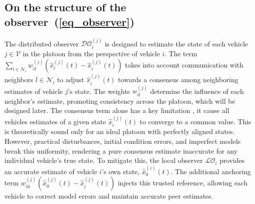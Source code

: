 \documentclass{ifacconf}
\def\eqref#1{(\ref{#1})}
\def\LO{\mathcal{LO}} %
\def\DO{\mathcal{DO}} %
\newtheorem{remark}{\it \textbf{Remark}}%
\begin{document}
\subsection{On the structure of the observer~\eqref{eq_observer}}
\vspace*{-0.3cm}
%
The distributed observer $\DO_i^{(j)}$ is designed to estimate the state of each vehicle $j \in \mathcal{V}$ in the platoon from the perspective of vehicle $i$. 
The term $\sum_{l \in {\mathcal{N}}_i} w_{il}^{(j)} \left( \hat{x}_l^{(j)}(t) - \hat{x}_i^{(j)}(t) \right)$ takes into account communication with neighbors $l \in {\mathcal{N}}_i$ to adjust $\hat{x}_i^{(j)}(t)$ towards a consensus among neighboring estimates of vehicle $j$'s state. The weights $w_{il}^{(j)}$ determine the influence of each neighbor's estimate, promoting consistency across the platoon, which will be designed later. The consensus term alone has a key limitation , it cause all vehicles estimates of a given state $\hat{x}_i^{(j)}(t)$ to converge to a common value. This is theoretically sound only for an ideal platoon with perfectly aligned states. However, practical disturbances, initial condition errors, and imperfect models break this uniformity, rendering a pure consensus estimate inaccurate for any individual vehicle's true state. To mitigate this, the local observer $\LO_i$ provides an accurate estimate of vehicle $i$'s own state, $\hat{x}_0^{(i)}(t)$. The additional anchoring term $w_{i0}^{(j)} \left( \hat{x}_0^{(j)}(t) - \hat{x}_i^{(j)}(t) \right)$ injects this trusted reference, allowing each vehicle to correct model errors and maintain accurate peer estimates.




\end{document}

